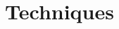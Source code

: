 \chapter{Techniques}
\begin{multicols*}{3}
\end{multicols*}


\begin{multicols*}{2}
  
\end{multicols*}
% 